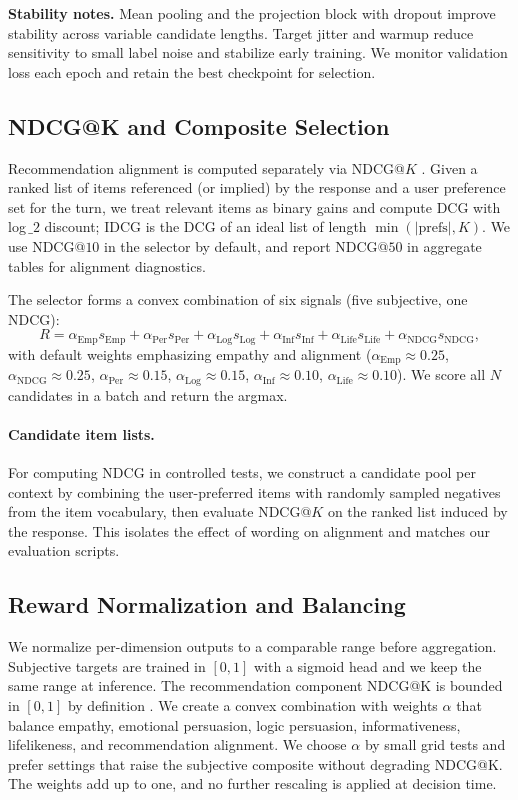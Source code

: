 \documentclass[12pt]{article}
\begin{document}
  \textbf{Stability notes.} Mean pooling and the projection block with dropout improve stability across variable candidate lengths. Target jitter and warmup reduce sensitivity to small label noise and stabilize early training. We monitor validation loss each epoch and retain the best checkpoint for selection.
  
  \subsection{NDCG@K and Composite Selection}
  Recommendation alignment is computed separately via NDCG@\(K\) \citep{evidently_ndcg}. Given a ranked list of items referenced (or implied) by the response and a user preference set for the turn, we treat relevant items as binary gains and compute DCG with log\,\(\_2\) discount; IDCG is the DCG of an ideal list of length \(\min(\lvert\text{prefs}\rvert, K)\). We use NDCG@\(10\) in the selector by default, and report NDCG@\(50\) in aggregate tables for alignment diagnostics.
  
  The selector forms a convex combination of six signals (five subjective, one NDCG):
  \[
  R = \alpha_{\mathrm{Emp}} s_{\mathrm{Emp}} + \alpha_{\mathrm{Per}} s_{\mathrm{Per}} + \alpha_{\mathrm{Log}} s_{\mathrm{Log}} + \alpha_{\mathrm{Inf}} s_{\mathrm{Inf}} + \alpha_{\mathrm{Life}} s_{\mathrm{Life}} + \alpha_{\mathrm{NDCG}} s_{\mathrm{NDCG}},
  \]
  with default weights emphasizing empathy and alignment (\(\alpha_{\mathrm{Emp}}\approx 0.25\), \(\alpha_{\mathrm{NDCG}}\approx 0.25\), \(\alpha_{\mathrm{Per}}\approx 0.15\), \(\alpha_{\mathrm{Log}}\approx 0.15\), \(\alpha_{\mathrm{Inf}}\approx 0.10\), \(\alpha_{\mathrm{Life}}\approx 0.10\)). We score all $N$ candidates in a batch and return the argmax.
  
  \paragraph{Candidate item lists.} For computing NDCG in controlled tests, we construct a candidate pool per context by combining the user-preferred items with randomly sampled negatives from the item vocabulary, then evaluate NDCG@\(K\) on the ranked list induced by the response. This isolates the effect of wording on alignment and matches our evaluation scripts.
  
  \subsection{Reward Normalization and Balancing}
  We normalize per-dimension outputs to a comparable range before aggregation. Subjective targets are trained in $[0,1]$ with a sigmoid head and we keep the same range at inference. The recommendation component NDCG@K is bounded in $[0,1]$ by definition \citep{evidently_ndcg}. We create a convex combination with weights $\alpha$ that balance empathy, emotional persuasion, logic persuasion, informativeness, lifelikeness, and recommendation alignment. We choose $\alpha$ by small grid tests and prefer settings that raise the subjective composite without degrading NDCG@K. The weights add up to one, and no further rescaling is applied at decision time.
  
\end{document}
